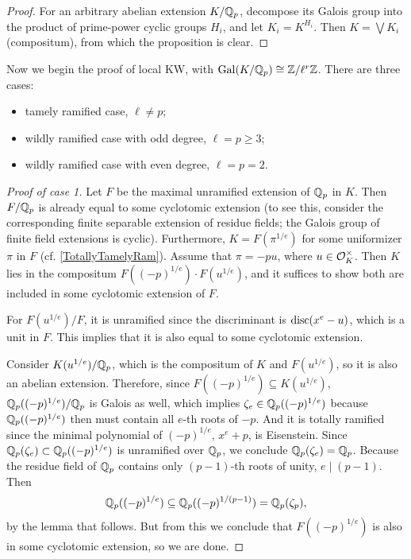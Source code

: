 \documentclass[11pt]{amsart}
\begin{document}
\begin{proof}
    For an arbitrary abelian extension $K/\mathbb{Q}_p$, decompose its Galois group into the product of prime-power cyclic groups $H_i$, and let $K_i = K^{H_i}$. Then $K = \bigvee K_i$ (compositum), from which the proposition is clear.
\end{proof}

Now we begin the proof of local KW, with $\operatorname{Gal}(K/\mathbb{Q}_p)\cong \mathbb{Z}/\ell^r\mathbb{Z}$. There are three cases:
\begin{itemize}
    \item tamely ramified case, $\ell\neq p$;
    \item wildly ramified case with odd degree, $\ell = p \ge 3$;
    \item wildly ramified case with even degree, $\ell = p = 2$.
\end{itemize}

\begin{proof}[Proof of case 1]

Let $F$ be the maximal unramified extension of $\mathbb{Q}_p$ in $K$. Then $F/\mathbb{Q}_p$ is already equal to some cyclotomic extension (to see this, consider the corresponding finite separable extension of residue fields; the Galois group of finite field extensions is cyclic). Furthermore, $K = F(\pi^{1/e})$ for some uniformizer $\pi$ in $F$ (cf. \ref{TotallyTamelyRam}). Assume that $\pi = -pu$, where $u \in \mathcal{O}_K^\times$. Then $K$ lies in the compositum $F((-p)^{1/e})\cdot F(u^{1/e})$, and it suffices to show both are included in some cyclotomic extension of $F$.

For $F(u^{1/e})/F$, it is unramified since the discriminant is $\operatorname{disc}(x^e-u)$, which is a unit in $F$. This implies that it is also equal to some cyclotomic extension.

Consider $K(u^{1/e})/\mathbb{Q}_p$, which is the compositum of $K$ and $F(u^{1/e})$, so it is also an abelian extension. Therefore, since $F((-p)^{1/e})\subseteq K(u^{1/e})$, $\mathbb{Q}_p((-p)^{1/e})/\mathbb{Q}_p$ is Galois as well, which implies $\zeta_e\in \mathbb{Q}_p((-p)^{1/e})$  because $\mathbb{Q}_p((-p)^{1/e})$ then must contain all $e$-th roots of $-p$. And it is totally ramified since the minimal polynomial of $(-p)^{1/e}$, $x^e + p$, is Eisenstein. Since $\mathbb{Q}_p(\zeta_e)\subset \mathbb{Q}_p((-p)^{1/e})$ is unramified over $\mathbb{Q}_p$, we conclude $\mathbb{Q}_p(\zeta_e) = \mathbb{Q}_p$. Because the residue field of $\mathbb{Q}_p$ contains only $(p-1)$-th roots of unity, $e\mid (p-1)$. Then
\[\mathbb{Q}_p((-p)^{1/e}) \subseteq \mathbb{Q}_p((-p)^{1/(p-1)}) = \mathbb{Q}_p(\zeta_p),\]
by the lemma that follows. But from this we conclude that $F((-p)^{1/e})$ is also in some cyclotomic extension, so we are done.
\end{proof}
\end{document}
